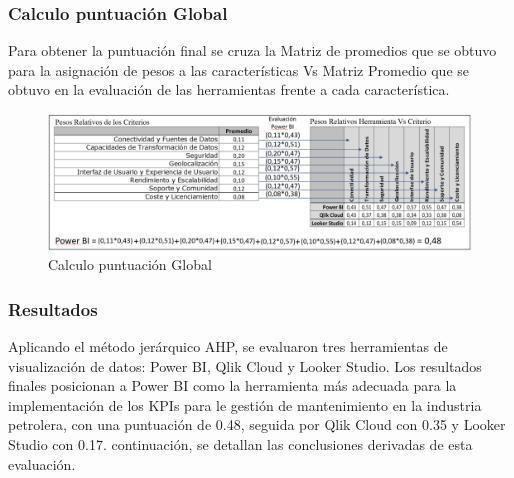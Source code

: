 \documentclass[
  11pt,
  bookmarksnumbered]{article}
\begin{document}
\hypertarget{calculo-puntuaciuxf3n-global}{%
\subsubsection{Calculo puntuación Global}\label{calculo-puntuaciuxf3n-global}}

Para obtener la puntuación final se cruza la Matriz de promedios que se obtuvo para la asignación de pesos a las características Vs Matriz Promedio que se obtuvo en la evaluación de las herramientas frente a cada característica.

\begin{figure}

{\centering \includegraphics[width=6.25in]{media 2/image47} 

}

\caption{Calculo puntuación Global}\label{fig:unnamed-chunk-54}
\end{figure}

\hypertarget{resultados}{%
\subsubsection{Resultados}\label{resultados}}

Aplicando el método jerárquico AHP, se evaluaron tres herramientas de visualización de datos: Power BI, Qlik Cloud y Looker Studio. Los resultados finales posicionan a Power BI como la herramienta más adecuada para la implementación de los KPIs para le gestión de mantenimiento en la industria petrolera, con una puntuación de 0.48, seguida por Qlik Cloud con 0.35 y Looker Studio con 0.17. continuación, se detallan las conclusiones derivadas de esta evaluación.
\end{document}
